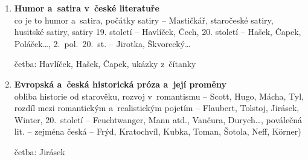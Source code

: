 \begin{enumerate}
\item \textbf{Humor a~satira v~české literatuře} \\ 
co je to humor a~satira, počátky satiry -- Mastičkář, staročeské satiry, 
husitské satiry, satiry 19. století -- Havlíček, Čech, 20. století --
Hašek, Čapek, Poláček\dots, 2.~pol.~20.~st. -- Jirotka, Škvorecký\dots

četba: Havlíček, Hašek, Čapek, ukázky z~čítanky 
      
\item \textbf{Evropská a~česká historická próza a~její proměny} \\ 
obliba historie od starověku, rozvoj v~romantismu -- Scott, Hugo, Mácha, 
Tyl, rozdíl mezi romantickým a~realistickým pojetím -- Flaubert, 
Tolstoj, Jirásek, Winter, 20.~století -- Feuchtwanger, Mann atd., Vančura, 
Durych\dots, poválečná lit. -- zejména česká -- Frýd, Kratochvíl, 
Kubka, Toman, Šotola, Neff, K\" orner) 

četba: Jirásek
\end{enumerate}

\twocolumn

